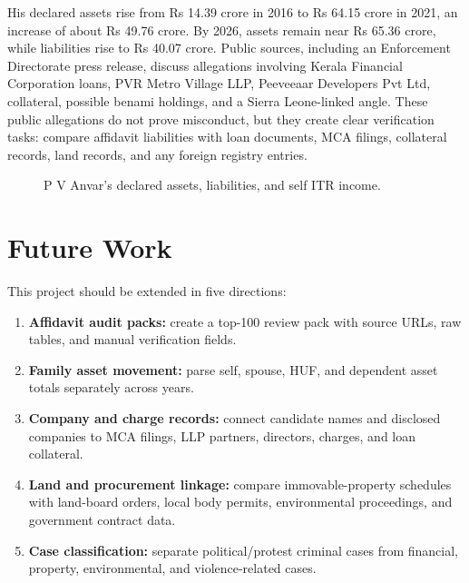 \documentclass[11pt]{article}
\begin{document}
His declared assets rise from Rs 14.39 crore in 2016 to Rs 64.15 crore in 2021, an increase of about Rs 49.76 crore. By 2026, assets remain near Rs 65.36 crore, while liabilities rise to Rs 40.07 crore. Public sources, including an Enforcement Directorate press release, discuss allegations involving Kerala Financial Corporation loans, PVR Metro Village LLP, Peeveeaar Developers Pvt Ltd, collateral, possible benami holdings, and a Sierra Leone-linked angle. These public allegations do not prove misconduct, but they create clear verification tasks: compare affidavit liabilities with loan documents, MCA filings, collateral records, land records, and any foreign registry entries.

\begin{figure}[H]
\centering
{}
\caption{P V Anvar's declared assets, liabilities, and self ITR income.}
\end{figure}

\section{Future Work}

This project should be extended in five directions:

\begin{enumerate}
  \item \textbf{Affidavit audit packs:} create a top-100 review pack with source URLs, raw tables, and manual verification fields.
  \item \textbf{Family asset movement:} parse self, spouse, HUF, and dependent asset totals separately across years.
  \item \textbf{Company and charge records:} connect candidate names and disclosed companies to MCA filings, LLP partners, directors, charges, and loan collateral.
  \item \textbf{Land and procurement linkage:} compare immovable-property schedules with land-board orders, local body permits, environmental proceedings, and government contract data.
  \item \textbf{Case classification:} separate political/protest criminal cases from financial, property, environmental, and violence-related cases.
\end{enumerate}
\end{document}
